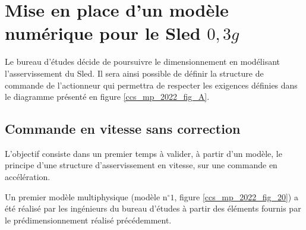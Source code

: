 \section{Mise en place d'un modèle numérique pour le Sled $0,3 g$ \label{ccs_mp_2022_sec_3}}
Le bureau d'études décide de poursuivre le dimensionnement en modélisant l'asservissement du Sled. Il sera ainsi possible de définir la structure de commande de l'actionneur qui permettra de respecter les exigences définies dans le diagramme présenté en figure \ref{ccs_mp_2022_fig_A}.
\subsection{Commande en vitesse sans correction \label{ccs_mp_2022_sec_3A}}
\begin{obj}
L'objectif consiste dans un premier temps à valider, à partir d'un modèle, le principe d'une structure d'asservissement en vitesse, sur une commande en accélération.
\end{obj}

Un premier modèle multiphysique (modèle $\mathrm{n}^{\circ} 1$, figure \ref{ccs_mp_2022_fig_20}) a été réalisé par les ingénieurs du bureau d'études à partir des éléments fournis par le prédimensionnement réalisé précédemment.

